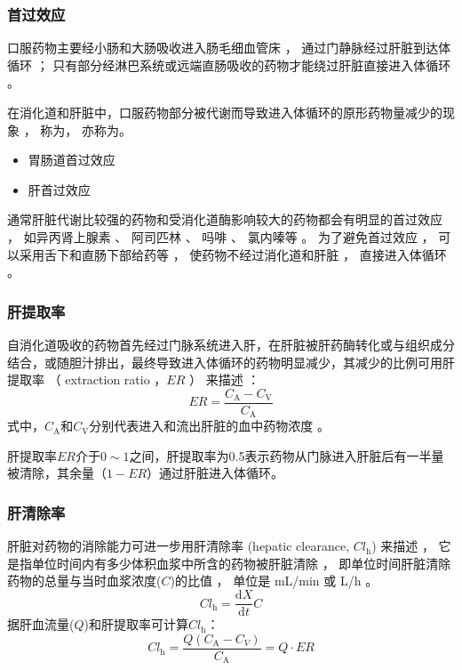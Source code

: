 \documentclass[dvipsnames, svgnames, x11names]{beamer}
\begin{document}
\begin{frame}
    \frametitle{首过效应}
    口服药物主要经小肠和大肠吸收进入肠毛细血管床 ， 通过门静脉经过肝脏到达体循环 ； 只有部分经淋巴系统或远端直肠吸收的药物才能绕过肝脏直接进入体循环 。 

    在消化道和肝脏中，口服药物部分被代谢而导致进入体循环的原形药物量减少的现象 ， 称为， 亦称为。
    \begin{itemize}
      \item 胃肠道首过效应
      \item 肝首过效应
    \end{itemize}
    \begin{blankblock}{}
      通常肝脏代谢比较强的药物和受消化道酶影响较大的药物都会有明显的首过效应 ， 如异丙肾上腺素 、 阿司匹林 、 吗啡 、 氯内嗪等 。 为了避免首过效应 ， 可以采用舌下和直肠下部给药等 ， 使药物不经过消化道和肝脏 ， 直接进入体循环 。
    \end{blankblock}
\end{frame}


\begin{frame}
    \frametitle{肝提取率}
    自消化道吸收的药物首先经过门脉系统进入肝，在肝脏被肝药酶转化或与组织成分结合，或随胆汁排出，最终导致进入体循环的药物明显减少，其减少的比例可用肝提取率 （ extraction ratio ，$ER$ ） 来描述 ：
    \[
        ER=\frac{C_{\mathrm{A}}-C_{\mathrm{V}}}{C_{\mathrm{A}}}
    \]
    式中，$C_{\mathrm{A}}$和$C_{\mathrm{V}}$分别代表进入和流出肝脏的血中药物浓度 。

    肝提取率$ER$介于$0\sim 1$之间，肝提取率为0.5表示药物从门脉进入肝脏后有一半量被清除，其余量（$1-ER$）通过肝脏进入体循环。

\end{frame}

\begin{frame}
    \frametitle{肝清除率}
    肝脏对药物的消除能力可进一步用肝清除率 (hepatic clearance, $Cl_{\mathrm{h}}$) 来描述 ， 它是指单位时间内有多少体积血浆中所含的药物被肝脏清除 ， 即单位时间肝脏清除药物的总量与当时血浆浓度($C$)的比值 ， 单位是 mL/min 或 L/h 。
    \[
      Cl_{\mathrm{h}}=\frac{\mathrm{d}X}{\mathrm{d}t}C
    \]
    据肝血流量($Q$)和肝提取率可计算$Cl_{\mathrm{h}}$：
    \[
      Cl_{\mathrm{h}}=\frac{Q(C_{\mathrm{A}}-C_{V})}{C_{\mathrm{A}}}=Q\cdot ER
    \]
\end{frame}
\end{document}

